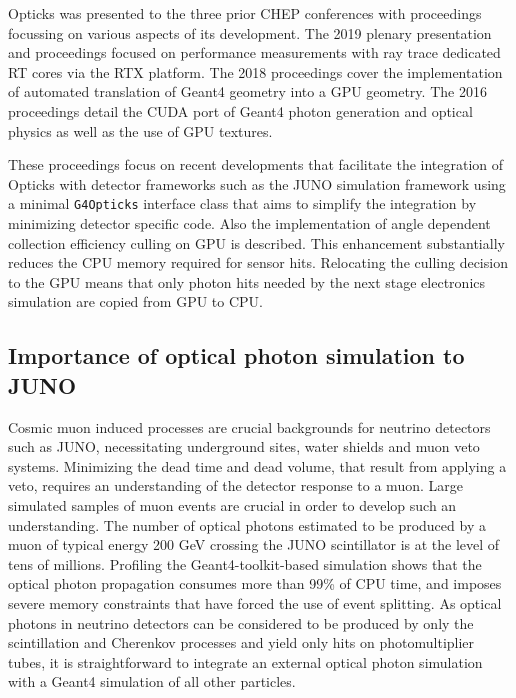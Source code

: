 \documentclass{webofc}
\begin{document}
Opticks was presented to the three prior CHEP conferences with proceedings
focussing on various aspects of its development. The 2019 plenary presentation 
and proceedings\cite{chep2019} focused on performance measurements with ray trace dedicated RT cores via the RTX platform. 
The 2018 proceedings\cite{chep2018} cover the implementation of automated
translation of Geant4 geometry into a GPU geometry.
The 2016 proceedings\cite{chep2016} detail the CUDA port of Geant4 photon generation 
and optical physics as well as the use of GPU textures. 
%

These proceedings focus on recent developments that facilitate the integration of Opticks 
with detector frameworks such as the JUNO simulation framework\cite{junosim} using a minimal 
{\tt G4Opticks} interface class that aims to simplify the integration 
by minimizing detector specific code. Also the implementation of angle dependent 
collection efficiency culling on GPU is described. This enhancement substantially 
reduces the CPU memory required for sensor hits.  Relocating the culling 
decision to the GPU means that only photon hits needed by the next stage electronics simulation 
are copied from GPU to CPU. 
%
\subsection{Importance of optical photon simulation to JUNO}%
%
%
Cosmic muon induced processes are crucial backgrounds for neutrino
detectors such as JUNO\cite{juno},
necessitating underground sites, water shields and muon veto systems.
Minimizing the dead time and dead volume, that result from applying
a veto, requires an understanding of the detector response to a muon.
Large simulated samples of muon events are crucial in order to
develop such an understanding.
%
The number of optical photons estimated to be produced by a muon of
typical energy 200 GeV crossing the JUNO scintillator is at the level of tens of millions.
Profiling the Geant4-toolkit-based simulation shows that the optical photon propagation 
consumes more than 99\% of CPU time, and imposes severe memory constraints that have forced
the use of event splitting.  
%
As optical photons in neutrino detectors can be considered to be produced
by only the scintillation and Cherenkov processes and yield only hits
on photomultiplier tubes, it is straightforward to integrate an
external optical photon simulation with a Geant4 simulation of all other particles.
%
\end{document}

